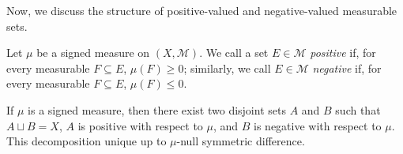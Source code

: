 \documentclass[10pt]{mypackage}
\begin{document}
Now, we discuss the structure of positive-valued and negative-valued measurable sets.
\begin{definition}
  Let $\mu$ be a signed measure on $\left( X,\mathcal{M} \right)$. We call a set $E\in \mathcal{M}$ \textit{positive} if, for every measurable $F\subseteq E$, $\mu\left( F \right) \geq 0$; similarly, we call $E\in \mathcal{M}$ \textit{negative} if, for every measurable $F\subseteq E$, $\mu\left( F \right) \leq 0$.
\end{definition}
\begin{theorem}
  If $\mu$ is a signed measure, then there exist two disjoint sets $A$ and $B$ such that $A\sqcup B = X$, $A$ is positive with respect to $\mu$, and $B$ is negative with respect to $\mu$. This decomposition unique up to $\mu$-null symmetric difference.
\end{theorem}
\end{document}
